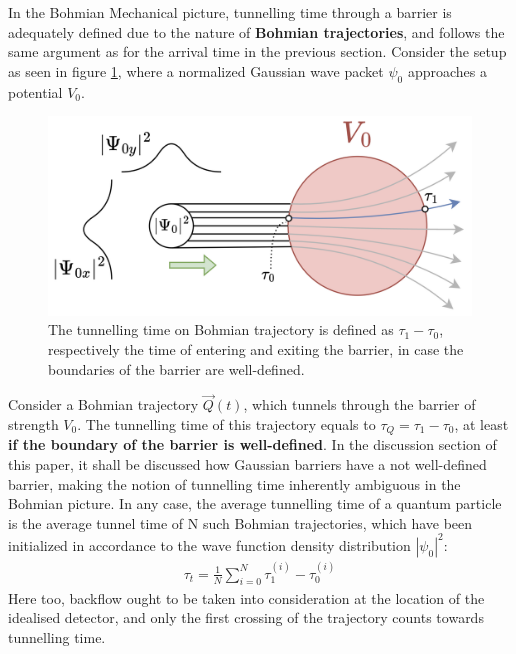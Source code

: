 In the Bohmian Mechanical picture, tunnelling time through a barrier is adequately defined due to the nature of \textbf{Bohmian trajectories}, and follows the same argument as for the arrival time in the previous section. Consider the setup as seen in figure \ref{fig:bohmian-tunnelling}, where a normalized Gaussian wave packet $\psi_0$ approaches a potential $V_0$.
\begin{figure}
    \centering
    \includegraphics[width=1\linewidth]{Figures//tunneling_time_bohm.png}
    \caption{The tunnelling time on Bohmian trajectory is defined as $\tau_1 - \tau_0$, respectively the time of entering and exiting the barrier, in case the boundaries of the barrier are well-defined.}
    \label{fig:bohmian-tunnelling}
\end{figure}
Consider a Bohmian trajectory $\vec{Q}(t)$, which tunnels through the barrier of strength $V_0$. The tunnelling time of this trajectory equals to $\tau_{Q} = \tau_1 - \tau_0$, at least \textbf{if the boundary of the barrier is well-defined}. In the discussion section of this paper, it shall be discussed how Gaussian barriers have a not well-defined barrier, making the notion of tunnelling time inherently ambiguous in the Bohmian picture. In any case, the average tunnelling time of a quantum particle is the average tunnel time of N such Bohmian trajectories, which have been initialized in accordance to the wave function density distribution $|\psi_0|^2$:
\begin{align}
    \tau_t = \frac{1}{N} \sum_{i=0}^{N} \tau_{1}^{(i)} - \tau_{0}^{(i)}
\end{align}
Here too, backflow ought to be taken into consideration at the location of the idealised detector, and only the first crossing of the trajectory counts towards tunnelling time.
